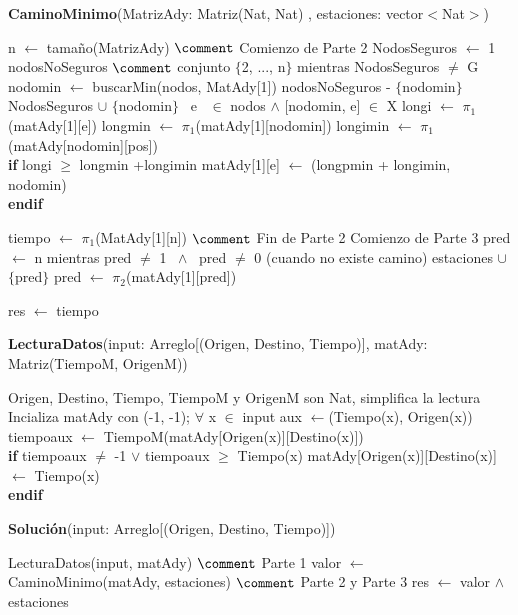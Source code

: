 \documentclass[spanish,12pt]{article}
\begin{document}
\begin{algorithm}[H]{\textbf{CaminoMinimo}(MatrizAdy: Matriz(Nat, Nat) , estaciones: vector$<$Nat$>$)}
	\begin{algorithmic}[1]
	
		\State n $\gets$ tamaño(MatrizAdy) $\comment$ Comienzo de Parte 2
		\State NodosSeguros $\gets$ 1
		\State nodosNoSeguros $\comment$ conjunto $\{$2, ..., n$\}$
		\State mientras NodosSeguros $\neq$ G
		\State \quad nodomin $\gets$ buscarMin(nodos, MatAdy[1])
		\State \quad nodosNoSeguros - $\{$nodomin$\}$
		\State \quad NodosSeguros $\cup$ $\{$nodomin$\}$
		\State \quad \forall \ e \ $\in$ nodos $\land$ [nodomin, e] $\in$ X
		\State \qquad longi $\gets$ $\pi_{1}$(matAdy[1][e])
		\State \qquad longmin $\gets$ $\pi_{1}$(matAdy[1][nodomin])
		\State \qquad longimin $\gets$ $\pi_{1}$(matAdy[nodomin][pos])
\\
		\qquad \textbf{if} longi $\geq$ longmin +longimin
			\State \qquad \quad matAdy[1][e] $\gets$ (longpmin + longimin, nodomin)
\\
 \qquad \textbf{endif}

		\State tiempo $\gets$ $\pi_{1}$(MatAdy[1][n]) $\comment$ Fin de Parte 2 Comienzo de Parte 3
		\State pred $\gets$ n
		\State mientras pred $\neq$ 1 \ $\land$ \ pred $\neq$ 0 (cuando no existe camino)
		\State \quad estaciones $\cup$ $\{$pred$\}$
		\State \quad pred $\gets$ $\pi_{2}$(matAdy[1][pred])

		\State res $\gets$ tiempo
 	\end{algorithmic}
\end{algorithm}

\begin{algorithm}[H]{\textbf{LecturaDatos}(input: Arreglo[(Origen, Destino, Tiempo)], matAdy: Matriz(TiempoM, OrigenM))}
	\begin{algorithmic}[1]
		\State Origen, Destino, Tiempo, TiempoM y OrigenM son Nat, simplifica la lectura
		\State Incializa matAdy con (-1, -1);
		\State $\forall$ x $\in$ input 
		\State \quad aux $\gets$(Tiempo(x), Origen(x))
		\State \quad tiempoaux $\gets$ TiempoM(matAdy[Origen(x)][Destino(x)])	
\\	
		\qquad \textbf{if} tiempoaux $\neq$ -1 $\vee$ tiempoaux $\geq$ Tiempo(x)
			\State \qquad \quad matAdy[Origen(x)][Destino(x)] $\gets$ Tiempo(x)
\\		 
 \qquad \textbf{endif}
	\end{algorithmic}
\end{algorithm}

\begin{algorithm}[H]{\textbf{Solución}(input: Arreglo[(Origen, Destino, Tiempo)])}
	\begin{algorithmic}[1]
		\State LecturaDatos(input, matAdy) $\comment$ Parte 1 
		\State valor $\gets$ CaminoMinimo(matAdy, estaciones) $\comment$ Parte 2 y Parte 3
		\State res $\gets$ valor $\land$ estaciones
	\end{algorithmic}
\end{algorithm}
\end{document}
